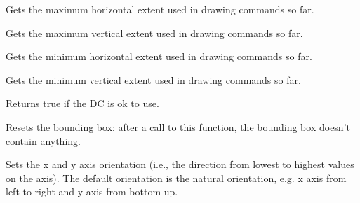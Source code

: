 \label{wxdcmaxx}


Gets the maximum horizontal extent used in drawing commands so far.


\label{wxdcmaxy}


Gets the maximum vertical extent used in drawing commands so far.


\label{wxdcminx}


Gets the minimum horizontal extent used in drawing commands so far.


\label{wxdcminy}


Gets the minimum vertical extent used in drawing commands so far.


\label{wxdcok}


Returns true if the DC is ok to use.


\label{wxdcresetboundingbox}


Resets the bounding box: after a call to this function, the bounding box
doesn't contain anything.




\label{wxdcsetaxisorientation}


Sets the x and y axis orientation (i.e., the direction from lowest to
highest values on the axis). The default orientation is the natural
orientation, e.g. x axis from left to right and y axis from bottom up.





